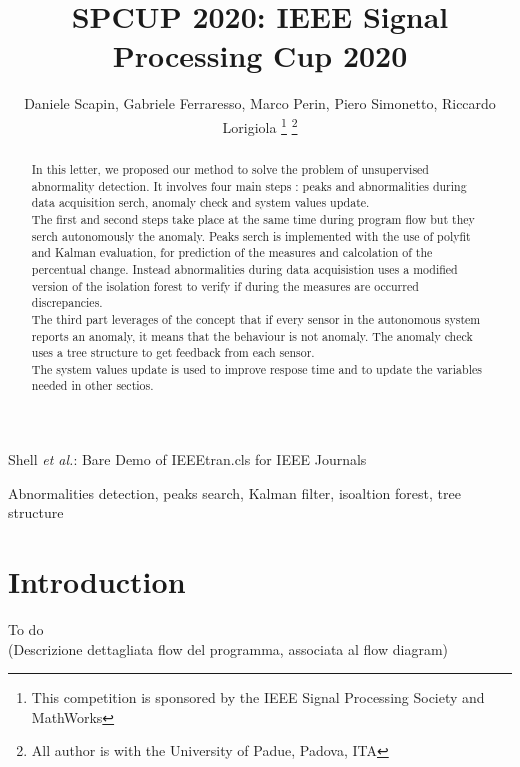 \documentclass[journal]{IEEEtran}
\begin{document}
\title{SPCUP 2020: IEEE Signal Processing Cup 2020}

\author{Daniele Scapin, Gabriele Ferraresso, Marco Perin, Piero Simonetto, Riccardo Lorigiola
\thanks{This competition is sponsored by the IEEE Signal Processing Society and MathWorks}
\thanks{All author is with the University of Padue, Padova, ITA}}

{Shell \MakeLowercase{\textit{et al.}}: Bare Demo of IEEEtran.cls for IEEE Journals}
\maketitle

\begin{abstract}
In this letter, we proposed our method to solve the problem of unsupervised abnormality detection.
It involves four main steps : peaks and abnormalities during data acquisition serch, anomaly check and system values update.
\\The first and second steps take place at the same time during program flow but they serch autonomously the anomaly. Peaks serch is implemented with the use of polyfit and Kalman evaluation, for prediction of the measures and calcolation of the percentual change. Instead abnormalities during data acquisistion uses a modified version of the isolation forest to verify if during the measures are occurred discrepancies.
\\ The third part leverages of the concept that if every sensor in the autonomous system reports an anomaly, it means that the behaviour is not anomaly. The anomaly check uses a tree structure to get feedback from each sensor.
\\ The system values update is used to improve respose time and to update the variables needed in other sectios.
\end{abstract}

\begin{IEEEkeywords}
Abnormalities detection, peaks search, Kalman filter, isoaltion forest, tree structure
\end{IEEEkeywords}

\IEEEpeerreviewmaketitle

\section{Introduction}

\IEEEPARstart
{T}{o do}
\\(Descrizione dettagliata flow del programma, associata al flow diagram)
\end{document}
